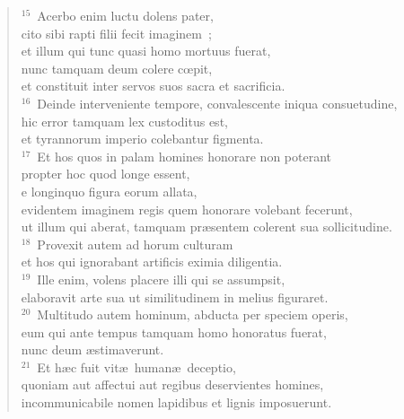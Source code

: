 \begin{flushleft}\begin{verse}${}^{15}$~Acerbo enim luctu dolens pater,\\ cito sibi rapti filii fecit imaginem~;\\ et illum qui tunc quasi homo mortuus fuerat,\\ nunc tamquam deum colere cœpit,\\ et constituit inter servos suos sacra et sacrificia.\\
${}^{16}$~Deinde interveniente tempore, convalescente iniqua consuetudine,\\ hic error tamquam lex custoditus est,\\ et tyrannorum imperio colebantur figmenta.\\
${}^{17}$~Et hos quos in palam homines honorare non poterant\\ propter hoc quod longe essent,\\ e longinquo figura eorum allata,\\ evidentem imaginem regis quem honorare volebant fecerunt,\\ ut illum qui aberat, tamquam pr\ae sentem colerent sua sollicitudine.\\
${}^{18}$~Provexit autem ad horum culturam\\ et hos qui ignorabant artificis eximia diligentia.\\
${}^{19}$~Ille enim, volens placere illi qui se assumpsit,\\ elaboravit arte sua ut similitudinem in melius figuraret.\\
${}^{20}$~Multitudo autem hominum, abducta per speciem operis,\\ eum qui ante tempus tamquam homo honoratus fuerat,\\ nunc deum \ae stimaverunt.\\
${}^{21}$~Et h\ae c fuit vit\ae\ human\ae\ deceptio,\\ quoniam aut affectui aut regibus deservientes homines,\\ incommunicabile nomen lapidibus et lignis imposuerunt.\end{verse}\end{flushleft}


